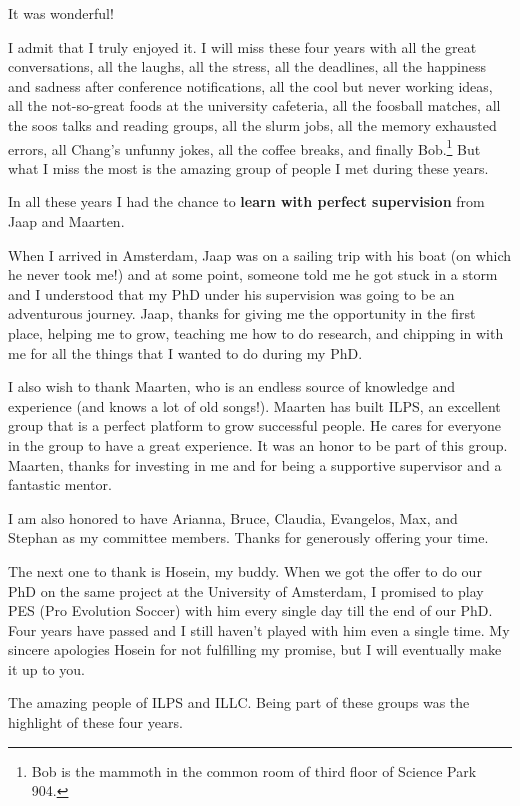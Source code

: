 \acknowledgments

It was wonderful! 

I admit that I truly enjoyed it. I will miss these four years with all the great conversations, all the laughs, all the stress, all the deadlines, all the happiness and sadness after conference notifications,  all the cool but never working ideas, all the not-so-great foods at the university cafeteria, all the foosball matches, all the soos talks and reading groups, all the slurm jobs, all the memory exhausted errors, all Chang's unfunny jokes, all the coffee breaks, and finally Bob.\footnote{Bob is the mammoth in the common room of third floor of Science Park 904.} But what I miss the most is the amazing group of people I met during these years.

In all these years I had the chance to \textbf{learn with perfect supervision} from Jaap and Maarten. 

When I arrived in Amsterdam, Jaap was on a sailing trip with his boat (on which he never took me!) and at some point, someone told me he got stuck in a storm and I understood that my PhD under his supervision was going to be an adventurous journey. Jaap, thanks for giving me the opportunity in the first place, helping me to grow, teaching me how to do research, and chipping in with me for all the things that I wanted to do during my PhD. 

I also wish to thank Maarten, who is an endless source of knowledge and experience (and knows a lot of old songs!). Maarten has built ILPS,  an excellent group that is a perfect platform to grow successful people. He cares for everyone in the group to have a great experience. It was an honor to be part of this group. Maarten, thanks for investing in me and for being a supportive supervisor and a fantastic mentor. 

I am also honored to have Arianna, Bruce, Claudia, Evangelos, Max, and Stephan as my committee members. Thanks for generously offering your time.

The next one to thank is Hosein, my buddy. When we got the offer to do our PhD on the same project at the University of Amsterdam, I promised to play PES (Pro Evolution Soccer) with him every single day till the end of our PhD. Four years have passed and I still haven't played with him even a single time. My sincere apologies Hosein for not fulfilling my promise, but I will eventually make it up to you.

The amazing people of ILPS and ILLC. Being part of these groups was the highlight of these four years. 

